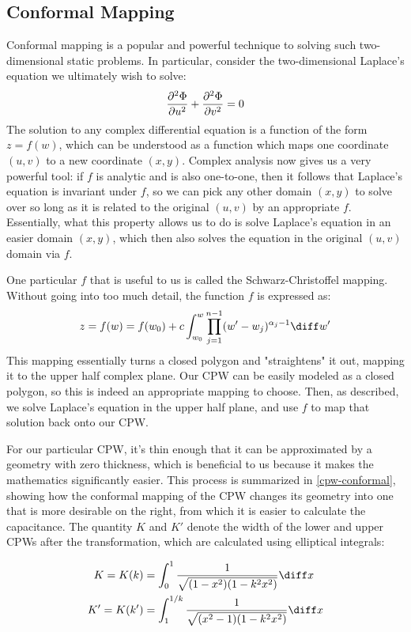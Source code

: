 \subsection{Conformal Mapping}
\label{conformal-map}
Conformal mapping is a popular and powerful technique to solving such two-dimensional static problems. In
particular, consider the two-dimensional Laplace's equation we ultimately wish to solve:
\[
	\pdv[2]{\Phi}{u} + \pdv[2]{\Phi}{v} = 0
\]
The solution to any complex differential equation is a function of the form \( z = f(w) \), which can be
understood as a function which maps one coordinate \( (u, v) \) to a new coordinate \( (x,y) \). Complex
analysis now gives us a very powerful tool: if \( f \) is analytic and is also one-to-one, then it follows
that Laplace's equation is invariant under \( f \), so we can pick any other domain \( (x, y) \) 
to solve over so long as it is related to the original \( (u, v) \) by an appropriate \( f \). Essentially, 
what this property allows us to do is solve Laplace's equation in an easier domain \( (x, y) \), which then 
also solves the equation in the original \( (u, v) \) domain via \( f \). 

One particular \( f \) that is useful to us is called the Schwarz-Christoffel mapping. Without going into too
much detail, the function \( f \) is expressed as:
\begin{equation}
	\label{sc-map}
	 z = f(w) = f(w_0)  + c \int_{w_0}^{w} \prod_{j = 1}^{n - 1}(w' - w_j)^{\alpha_j - 1} \diff w'
 \end{equation}
This mapping essentially turns a closed polygon and "straightens" it out,
mapping it to the upper half complex plane. Our CPW can be easily modeled as a closed polygon, so this is
indeed an appropriate mapping to choose. Then, as described, we solve Laplace's equation in the upper half
plane, and use \( f \) to map that solution back onto our CPW. 
 
For our particular CPW, it's thin enough that it can be approximated by a geometry with zero thickness, which
is beneficial to us because it makes the mathematics significantly easier. 
This process is summarized in \cref{cpw-conformal}, showing how the conformal mapping of the CPW changes its
geometry into one that is more desirable on the right, from which it is easier to calculate the capacitance.
The quantity \( K \) and \( K' \) denote the width of the lower and upper CPWs after the transformation,
which are calculated using elliptical integrals: 

\begin{align*}
	K = K(k) &= \int_{0}^{1}\frac{1}{\sqrt{(1 - x^2)(1 - k^2 x^2)}} \diff x\\
	K' = K(k') &= \int_{1}^{1 / k} \frac{1}{\sqrt{(x^2 - 1)(1 - k^2 x^2)}} \diff x
\end{align*}

